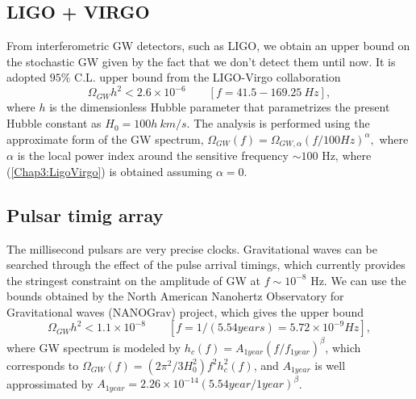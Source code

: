 \documentclass[11pt,a4paper,twoside]{book}
\begin{document}
\subsection*{LIGO + VIRGO}
From interferometric GW detectors, such as LIGO, we obtain an upper bound on the stochastic GW given  by the fact that we don't detect them until now. It is adopted $ 95\% $ C.L. upper bound from the LIGO-Virgo collaboration  \cite{Chap3:Ligo_Virgo}
\begin{equation}
	\label{Chap3:LigoVirgo}
	\Omega_{GW}h^{2} < 2.6 \times 10^{-6} \qquad  [f = 41.5 - 
	169.25\ Hz] ,
\end{equation}
where $ h $ is the dimensionless Hubble parameter that parametrizes the present Hubble constant as $ H_{0} = 100h\  km/s $. The analysis is performed using the approximate form of the GW spectrum, $ \Omega_{GW}(f)=\Omega_{GW,\alpha}(f/100Hz)^{\alpha}, $ where $\alpha$ is the local power index around the sensitive frequency $\sim 100$ Hz, where (\ref{Chap3:LigoVirgo}) is obtained assuming $\alpha=0$.
\subsection*{Pulsar timig array}
 The millisecond pulsars are very precise clocks. Gravitational waves can be searched through the effect of the pulse arrival timings, which currently provides the stringest constraint on the amplitude of GW at $ f\sim 10^{-8} $ Hz. We can use the bounds obtained by the North American Nanohertz Observatory for Gravitational waves (NANOGrav) project, which gives the upper bound \cite{Chap3:PulsarTiming}
 \begin{equation}
 	\Omega_{GW}h^{2} < 1.1 \times 10^{-8}   \qquad [f = 1/(5.54 years) = 5.72 \times 10^{-9} Hz],
 \end{equation}
where GW spectrum is modeled by $ h_{c}(f) = A_{1year}(f/f_{1year})^{\beta} $, which corresponds to $\Omega_{GW}(f)=(2\pi^{2}/3H_{0}^{2})f^{2}h_{c}^{2}(f)$, and $ A_{1year} $ is well approssimated by $ A_{1year}=2.26\times 10^{-14}(5.54year/1year)^{\beta}$.
\end{document}
